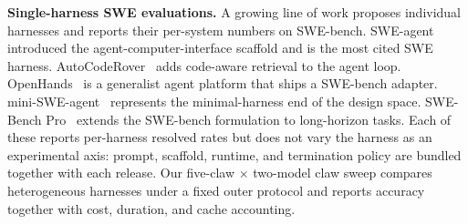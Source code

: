 \documentclass{llmxive}
\begin{document}
\textbf{Single-harness SWE evaluations.}
A growing line of work proposes individual harnesses and reports their per-system numbers on SWE-bench. SWE-agent~\cite{swe_agent} introduced the agent-computer-interface scaffold and is the most cited SWE harness. AutoCodeRover~\cite{zhang_autocoderover} adds code-aware retrieval to the agent loop. OpenHands~\cite{wang_openhands} is a generalist agent platform that ships a SWE-bench adapter. mini-SWE-agent~\cite{mini_swe_agent} represents the minimal-harness end of the design space. SWE-Bench Pro~\cite{deng_swebench_pro} extends the SWE-bench formulation to long-horizon tasks. Each of these reports per-harness resolved rates but does not vary the harness as an experimental axis: prompt, scaffold, runtime, and termination policy are bundled together with each release. Our five-claw $\times$ two-model claw sweep compares heterogeneous harnesses under a fixed outer protocol and reports accuracy together with cost, duration, and cache accounting.

\end{document}
